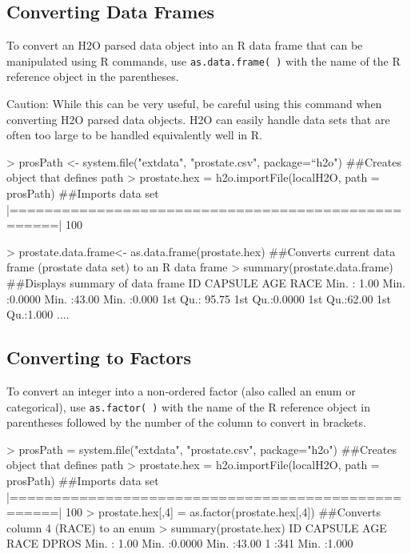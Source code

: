 \documentclass[11pt]{article}
\begin{document}
\subsection{Converting Data Frames}

To convert an H2O parsed data object into an R data frame that can be manipulated using R commands, use {\texttt{as.data.frame( )}} with the name of the R reference object in the parentheses.

Caution: While this can be very useful, be careful using this command when converting H2O parsed data objects. H2O can easily handle data sets that are often too large to be handled equivalently well in R. 

\begin{spverbatim}
> prosPath <- system.file("extdata", "prostate.csv", package=“h2o")
##Creates object that defines path
 > prostate.hex = h2o.importFile(localH2O, path = prosPath)
##Imports data set
  |===================================================| 100%

 > prostate.data.frame<- as.data.frame(prostate.hex)
##Converts current data frame (prostate data set) to an R data frame
 > summary(prostate.data.frame) ##Displays summary of data frame
       ID            CAPSULE            AGE             RACE
Min.   :  1.00   Min.   :0.0000   Min.   :43.00   Min.   :0.000
1st Qu.: 95.75   1st Qu.:0.0000   1st Qu.:62.00   1st Qu.:1.000
       .... 
\end{spverbatim}


\subsection{Converting to Factors}

To convert an integer into a non-ordered factor (also called an enum or categorical), use {\texttt{as.factor( )}} with the name of the R reference object in parentheses followed by the number of the column to convert in brackets. 
\begin{spverbatim}
> prosPath = system.file("extdata", "prostate.csv", package="h2o")
##Creates object that defines path
> prostate.hex = h2o.importFile(localH2O, path = prosPath)
##Imports data set
|===================================================| 100%
> prostate.hex[,4] = as.factor(prostate.hex[,4]) 
##Converts column 4 (RACE) to an enum
> summary(prostate.hex)
 ID               CAPSULE          AGE             RACE    DPROS
 Min.   :  1.00   Min.   :0.0000   Min.   :43.00   1 :341  Min.   :1.000
\end{spverbatim}
\end{document}
